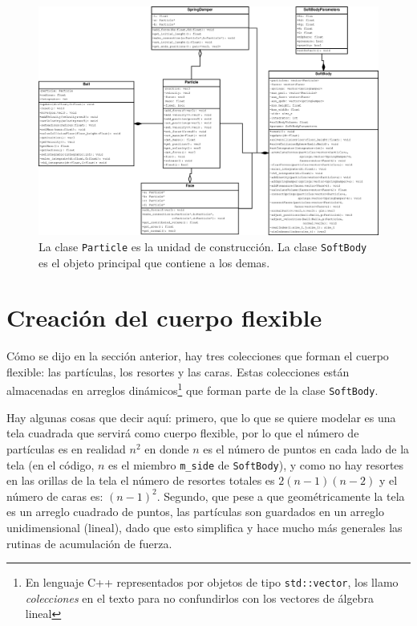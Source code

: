 \begin{figure}
 \centering
 \includegraphics[width=\textwidth]{Img/03/diagramaClases}
 \caption[Diagrama de clases]{ 
 La clase \texttt{Particle} es la unidad de construcción. La clase \texttt{SoftBody} es el objeto principal que contiene a los demas. 
 } \label{clases:fig}
\end{figure}

\section{Creación del cuerpo flexible}

Cómo se dijo en la sección anterior, hay tres colecciones que forman el cuerpo flexible: las partículas, los resortes y las caras.
Estas colecciones están almacenadas en arreglos dinámicos\footnote{En lenguaje C++ representados por objetos de tipo \texttt{std::vector}, los llamo \emph{colecciones} en el texto para no confundirlos con los vectores de álgebra lineal} que forman parte de la clase \texttt{SoftBody}.

Hay algunas cosas que decir aquí: primero, que lo que se quiere modelar es una tela cuadrada que servirá como cuerpo flexible, por lo que el número de partículas es en realidad $n^{2}$ en donde $n$ es el número de puntos en cada lado de la tela (en el código, $n$ es el miembro \texttt{m_side} de \texttt{SoftBody}), y como no hay resortes en las orillas de la tela el número de resortes totales es $2 (n - 1) (n - 2)$ y el número de caras es: $(n-1)^{2}$.
Segundo, que pese a que geométricamente la tela es un arreglo cuadrado de puntos, las partículas son guardados en un arreglo unidimensional (lineal), dado que esto  simplifica y hace mucho más generales las rutinas de acumulación de fuerza.

